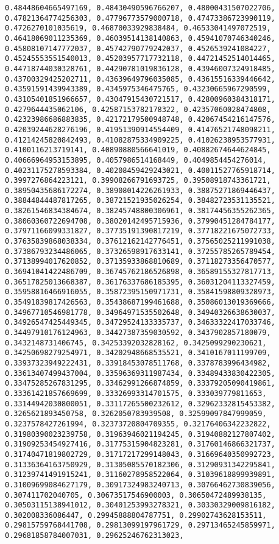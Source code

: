 \documentclass[11pt]{article}
\begin{document}
\begin{Verbatim}[commandchars=\\\{\}]
0.48448604665497169, 0.48430490596766207, 0.48000431507022706, 0.47821364774256303, 0.47796773579000718, 0.47473386723990119, 0.4726270101035619, 0.46870033929838484, 0.46533041497072519, 0.46418069011235369, 0.46039514138140863, 0.45941070746340246, 0.45808107147772037, 0.45742790779242037, 0.4526539241084227, 0.45245553551540013, 0.45203957717732118, 0.44721452514014465, 0.44718744030328761, 0.44290781019836128, 0.43946007324918485, 0.43700329425202711, 0.43639649796035085, 0.43615516339446642, 0.43591591439943389, 0.4345975346475765, 0.43230665967290599, 0.43105401851966657, 0.43047915430721517, 0.42800960384318171, 0.4279644435062106, 0.42587153782178322, 0.42357060028474808, 0.42323986686883835, 0.42172179500948748, 0.42067454216147576, 0.42039244628276196, 0.41951390914554409, 0.41476521748098211, 0.41214245820842493, 0.41082875334909225, 0.41026238953577931, 0.4100116213719141, 0.40890880566641019, 0.40882674644624845, 0.40666964953153895, 0.4057986514168449, 0.4049854454276014, 0.40231175278593384, 0.40208459429243021, 0.40011527765918714, 0.3997276864223121, 0.39908266791693725, 0.39508918743361721, 0.38950435686172274, 0.38908014226261933, 0.38875271869446437, 0.38844844487817265, 0.38721521935026254, 0.38482723531135521, 0.38261546834384674, 0.38245748800306961, 0.38174456355262365, 0.38060360722694708, 0.38020142495715936, 0.37990451284784177, 0.37971166099331827, 0.37735191390817219, 0.37718221675072733, 0.37635839868038334, 0.37612162142776451, 0.37565025211991038, 0.37386793234486065, 0.37326598917633141, 0.37255785265789454, 0.37138994017620852, 0.37135933868810689, 0.37118273356470577, 0.36941041422486709, 0.36745762186526898, 0.36589155327817713, 0.36517825013668387, 0.36176337686185395, 0.36031204113327459, 0.35958816466916055, 0.35872395150971731, 0.35841598809328973, 0.35491839817426563, 0.35438687199461688, 0.35086013019369666, 0.34967710546981778, 0.34964971535502648, 0.34940326638630037, 0.34926547425449345, 0.34729524133335737, 0.34633322417033746, 0.34497910176124963, 0.34427387359030592, 0.3437902857180079, 0.3432148731406745, 0.34253392032828162, 0.3425099290230621, 0.34250698279254971, 0.34202948668535521, 0.3410167011199709, 0.33937323949222431, 0.33918453078511768, 0.3378783996434982, 0.33613407499437004, 0.33596369311987434, 0.33489433830422305, 0.33475285267831295, 0.33462991266874859, 0.33379205090419861, 0.33361421857669699, 0.33326993314701575, 0.333039779811653, 0.33144942030800051, 0.33117265500232612, 0.32962332815453382, 0.3265621893450758, 0.3262050783939508, 0.32599097847999059, 0.3237578427261994, 0.32373720804709355, 0.32176406342232822, 0.31980390023239758, 0.31963946021194245, 0.31940882127807402, 0.31909253454927416, 0.31775315904823281, 0.31760146866321737, 0.31740471819802729, 0.31717217299148043, 0.31669640350992723, 0.31336364163750929, 0.31305085570182306, 0.31290931342295841, 0.31239741491915241, 0.31160278958522064, 0.31039618899939891, 0.31009699084627179, 0.30917324983240713, 0.30766462730839056, 0.307411702040705, 0.30673517546900003, 0.30650472489938135, 0.30503115138941012, 0.30401253993278321, 0.30330329009816182, 0.302008336086447, 0.29945888804787751, 0.29902743628153511, 0.29815759768441708, 0.29813099197961729, 0.29713465245859971, 0.29681858784007031, 0.29625246762313023, 
\end{Verbatim}
\end{document}
